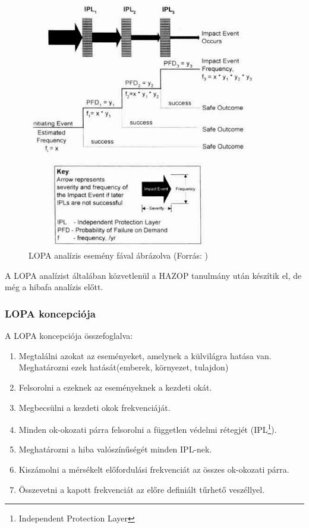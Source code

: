 \begin{figure}
    \footnotesize
    \centering
    \includegraphics[width=100mm, keepaspectratio]{figures/lopa.jpg}
    \caption{LOPA analízis esemény fával ábrázolva (Forrás: \cite{LOPA1})}
    \label{fig:lop_eta}
\end{figure}

A LOPA analízist általában közvetlenül a HAZOP tanulmány után készítik el, de még a hibafa analízis előtt.

\subsubsection{LOPA koncepciója}
A LOPA koncepciója összefoglalva:
\begin{enumerate}
    \item Megtalálni azokat az eseményeket, amelynek a külvilágra hatása van. Meghatározni ezek hatását(emberek, környezet, tulajdon)
    \item Felsorolni a ezeknek az eseményeknek a kezdeti okát.
    \item Megbecsülni a kezdeti okok frekvenciáját.
    \item Minden ok-okozati párra felsorolni a független védelmi rétegjét (IPL\footnote{Independent Protection Layer}).
    \item Meghatározni a hiba valószínűségét minden IPL-nek.
    \item Kiszámolni a mérsékelt előfordulási frekvenciát az összes ok-okozati párra.
    \item Összevetni a kapott frekvenciát az előre definiált tűrhető veszéllyel.
\end{enumerate}

